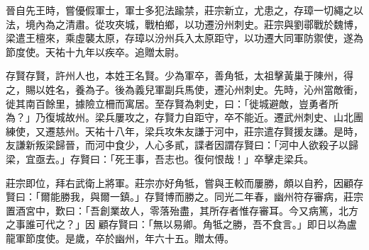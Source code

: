 \begin{pinyinscope}
 晉自先王時，嘗優假軍士，軍士多犯法踰禁，莊宗新立，尤患之，存璋一切繩之以法，境內為之清肅。從攻夾城，戰柏鄉，以功遷汾州刺史。莊宗與劉鄩戰於魏博，梁遣王檀來，乘虛襲太原，存璋以汾州兵入太原距守，以功遷大同軍防禦使，遂為節度使。天祐十九年以疾卒。追贈太尉。



 存賢存賢，許州人也，本姓王名賢。少為軍卒，善角牴，太祖擊黃巢于陳州，得之，賜以姓名，養為子。後為義兒軍副兵馬使，遷沁州刺史。先時，沁州當敵衝，徙其南百餘里，據險立柵而寓居。至存賢為刺史，曰：「徙城避敵，豈勇者所
 為？」乃復城故州。梁兵屢攻之，存賢力自距守，卒不能近。遷武州刺史、山北團練使，又遷慈州。天祐十八年，梁兵攻朱友謙于河中，莊宗遣存賢援友謙。是時，友謙新叛梁歸晉，而河中食少，人心多貳，諜者因謂存賢曰：「河中人欲殺子以歸梁，宜亟去。」存賢曰：「死王事，吾志也。復何恨哉！」卒擊走梁兵。



 莊宗即位，拜右武衛上將軍。莊宗亦好角牴，嘗與王較而屢勝，頗以自矜，因顧存賢曰：「爾能勝我，與爾一鎮。」存賢博而勝之。同光二年春，幽州符存審病，莊宗置酒宮中，歎曰：「吾創業故人，零落殆盡，其所存者惟存審耳。今又病篤，北方之事誰可代之？」因
 顧存賢曰：「無以易卿。角牴之勝，吾不食言。」即日以為盧龍軍節度使。是歲，卒於幽州，年六十五。贈太傅。



\end{pinyinscope}